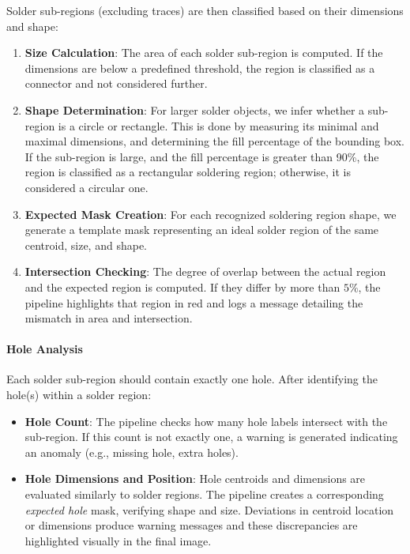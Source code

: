 \documentclass[a4paper,12pt]{article}
\begin{document}
Solder sub-regions (excluding traces) are then classified based on their dimensions and shape:
\begin{enumerate}
    \item \textbf{Size Calculation}: The area of each solder sub-region is computed. If the dimensions are below a predefined threshold, the region is classified as a connector and not considered further.
    \item \textbf{Shape Determination}: For larger solder objects, we infer whether a sub-region is a circle or rectangle. This is done by measuring its minimal and maximal dimensions, and determining the fill percentage of the bounding box. If the sub-region is large, and the fill percentage is greater than 90\%, the region is classified as a rectangular soldering region; otherwise, it is considered a circular one.
    \item \textbf{Expected Mask Creation}: For each recognized soldering region shape, we generate a template mask representing an ideal solder region of the same centroid, size, and shape.
    \item \textbf{Intersection Checking}: The degree of overlap between the actual region and the expected region is computed. If they differ by more than \(5\%\), the pipeline highlights that region in red and logs a message detailing the mismatch in area and intersection.
\end{enumerate}

\paragraph{Hole Analysis}

Each solder sub-region should contain exactly one hole. After identifying the hole(s) within a solder region:
\begin{itemize}
    \item \textbf{Hole Count}: The pipeline checks how many hole labels intersect with the sub-region. If this count is not exactly one, a warning is generated indicating an anomaly (e.g., missing hole, extra holes).
    \item \textbf{Hole Dimensions and Position}: Hole centroids and dimensions are evaluated similarly to solder regions. The pipeline creates a corresponding \emph{expected hole} mask, verifying shape and size. Deviations in centroid location or dimensions produce warning messages and these discrepancies are highlighted visually in the final image.
\end{itemize}
\end{document}

